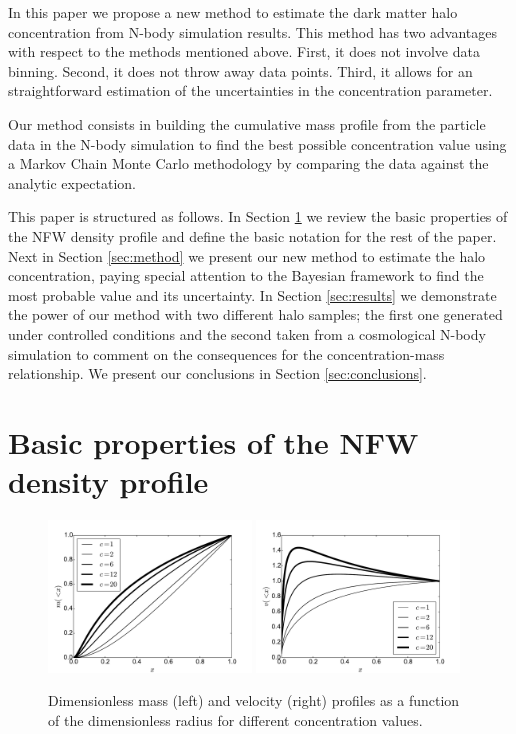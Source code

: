 \documentclass[useAMS,usenatbib]{mn2e}
\begin{document}
In this paper we propose a new method to estimate the dark matter halo
concentration from N-body simulation results. This method has two
advantages with respect to the methods mentioned above. First, it does
not involve data binning. Second, it does not throw away data
points. Third, it allows for an straightforward estimation of the
uncertainties in the concentration parameter.

Our method consists in building the cumulative mass profile from the
particle data in the N-body simulation to find the best possible
concentration value using a Markov Chain Monte Carlo methodology by
comparing the data against the analytic expectation.

This paper is structured as follows. In Section \ref{sec:basics} we
review the basic properties of the NFW density profile and define the
basic notation for the rest of the paper. Next in Section
\ref{sec:method} we present our new method to estimate the halo
concentration, paying special attention to the Bayesian framework to
find the most probable value and its uncertainty. In Section
\ref{sec:results} we demonstrate the power of our method with two
different halo samples; the first one generated under controlled
conditions and the second taken from a cosmological N-body
simulation to comment on the consequences for the concentration-mass
relationship. We present our conclusions in Section
\ref{sec:conclusions}.



\section{Basic properties of the NFW density profile}
\label{sec:basics}

\begin{figure}
\begin{center}
  \includegraphics[width=0.48\textwidth]{nfw_normalized.pdf}
  \includegraphics[width=0.48\textwidth]{vel_normalized.pdf}
\end{center}
\caption{Dimensionless mass (left) and velocity (right) profiles as a
  function of the dimensionless radius for different concentration
  values. \label{fig:profiles}}
\end{figure}
\end{document}
